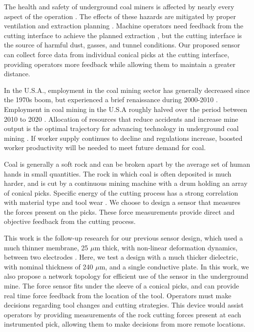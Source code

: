 The health and safety of underground coal miners is affected by 
nearly every aspect of the operation \cite{Khanzode2011}.
The effects of these hazards are mitigated by proper ventilation and extraction planning \cite{Saleh2011}.
Machine operators need feedback from the cutting interface to achieve the planned extraction \cite{Bartels2009},
but the cutting interface is the source of harmful dust, gasses, and tunnel conditions.
Our proposed sensor can collect force data from individual conical picks at the cutting interface, 
providing operators more feedback while allowing them to maintain a greater distance.

In the U.S.A., employment in the coal mining sector has generally 
decreased since the 1970s boom, but experienced a brief renaissance during 2000-2010 \cite{Betz2015}.
Employment in coal mining in the U.S.A roughly halved over the period between 2010 to 2020 \cite{FRED2023}.
Allocation of resources that reduce accidents and increase mine output is 
the optimal trajectory for advancing technology in underground coal mining \cite{Sider1983}.
If worker supply continues to decline and regulations increase,
boosted worker productivity will be needed to meet future demand for coal.

Coal is generally a soft rock and can be broken apart by the average set of human hands in small quantities.
The rock in which coal is often deposited is much harder, 
and is cut by a continuous mining machine with a drum holding an array of conical picks.
Specific energy of the cutting process has a strong correlation with material type and tool wear \cite{TEALE196557}.
We choose to design a sensor that measures the forces present on the picks. 
These force measurements provide direct and objective feedback from the cutting process.

This work is the follow-up research for our previous sensor design, 
which used a much thinner membrane, 25 $\mu$m thick, with non-linear deformation dynamics,
between two electrodes \cite{oltmanns2023low}.
Here, we test a design with a much thicker dielectric, 
with nominal thickness of 240 $\mu$m, and a single conductive plate.
In this work, we also propose a network topology for efficient use of the sensor
in the underground mine. 
The force sensor fits under the sleeve of a conical picks, 
and can provide real time force feedback from the location of the tool.
Operators must make decisions regarding tool changes and cutting strategies.
This device would assist operators by providing measurements of the rock cutting forces
present at each instrumented pick, allowing them to make decisions from more remote locations.

